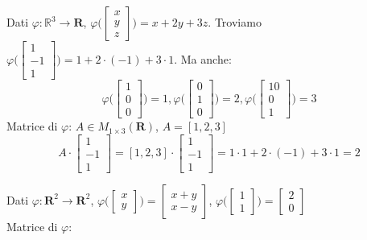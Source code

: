 \begin{example}
	Dati $\varphi: \mathbb{R}^3 \rightarrow \mathbf{R}$, $\varphi \bigg(\begin{bmatrix}
		x \\ y \\ z
	\end{bmatrix}\bigg) = x + 2y + 3z$. Troviamo $\varphi \bigg(\begin{bmatrix}
1 \\ -1 \\ 1
\end{bmatrix}\bigg) = 1 + 2 \cdot (-1) + 3 \cdot 1$.
Ma anche:
\begin{equation*}
	\varphi\bigg(
	\begin{bmatrix}
		1 \\ 0 \\ 0
	\end{bmatrix}
	\bigg) = 1,
	\varphi\bigg(
	\begin{bmatrix}
		0 \\ 1 \\ 0
	\end{bmatrix}
	\bigg) = 2,
	\varphi\bigg(
	\begin{bmatrix}
		10 \\ 0 \\ 1
	\end{bmatrix}
	\bigg) = 3
\end{equation*}
Matrice di $\varphi$: $A \in M_{1 \times 3} (\mathbf{R})$, $A = [1, 2, 3]$
\begin{equation*}
	A \cdot \begin{bmatrix}
		1 \\ -1 \\ 1
	\end{bmatrix} = [1, 2, 3] \cdot \begin{bmatrix}
	1 \\ -1 \\ 1
\end{bmatrix} = 1 \cdot 1 + 2 \cdot (-1) + 3 \cdot 1 = 2
\end{equation*}
\end{example}
\begin{example}
	Dati $\varphi: \mathbf{R}^2 \rightarrow \mathbf{R}^2$, $\varphi\bigg(\begin{bmatrix}
		x \\ y
	\end{bmatrix}\bigg) = \begin{bmatrix}
	x+y \\ x - y
\end{bmatrix}$, $\varphi\bigg(\begin{bmatrix}
1 \\ 1
\end{bmatrix}\bigg) = \begin{bmatrix}
2 \\ 0
\end{bmatrix}$\\
Matrice di $\varphi$:
\end{example}
